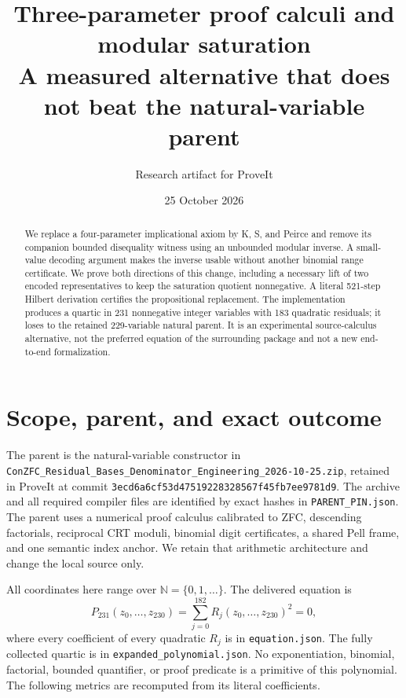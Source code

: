 \documentclass[11pt]{article}
\title{Three-parameter proof calculi and modular saturation\\
\large A measured alternative that does not beat the natural-variable parent}
\author{Research artifact for ProveIt}
\date{25 October 2026}
\newcommand{\NN}{\mathbb N}
\newcommand{\file}[1]{\texttt{\nolinkurl{#1}}}
\begin{document}
\maketitle
\begin{abstract}
We replace a four-parameter implicational axiom by K, S, and Peirce and
remove its companion bounded disequality witness using an unbounded modular
inverse. A small-value decoding argument makes the inverse usable without
another binomial range certificate. We prove both directions of this change,
including a necessary lift of two encoded representatives to keep the
saturation quotient nonnegative. A literal 521-step Hilbert derivation
certifies the propositional replacement. The implementation produces a
quartic in 231 nonnegative integer variables with 183 quadratic residuals;
it loses to the retained 229-variable natural parent. It is an experimental
source-calculus alternative, not the preferred equation of the surrounding
package and not a new end-to-end formalization.
\end{abstract}

\section{Scope, parent, and exact outcome}

The parent is the natural-variable constructor in
\file{ConZFC_Residual_Bases_Denominator_Engineering_2026-10-25.zip},
retained in ProveIt at commit
\file{3ecd6a6cf53d47519228328567f45fb7ee9781d9}.
The archive and all required compiler files are identified by exact hashes
in \file{PARENT_PIN.json}. The parent uses a numerical proof calculus
calibrated to ZFC, descending factorials, reciprocal CRT moduli, binomial
digit certificates, a shared Pell frame, and one semantic index anchor.
We retain that arithmetic architecture and change the local source only.

All coordinates here range over $\NN=\{0,1,\ldots\}$. The delivered equation is
\[
 P_{231}(z_0,\ldots,z_{230})=
 \sum_{j=0}^{182} R_j(z_0,\ldots,z_{230})^2=0,
\]
where every coefficient of every quadratic $R_j$ is in
\file{equation.json}. The fully collected quartic is in
\file{expanded_polynomial.json}. No exponentiation, binomial, factorial,
bounded quantifier, or proof predicate is a primitive of this polynomial.
The following metrics are recomputed from its literal coefficients.
\end{document}
